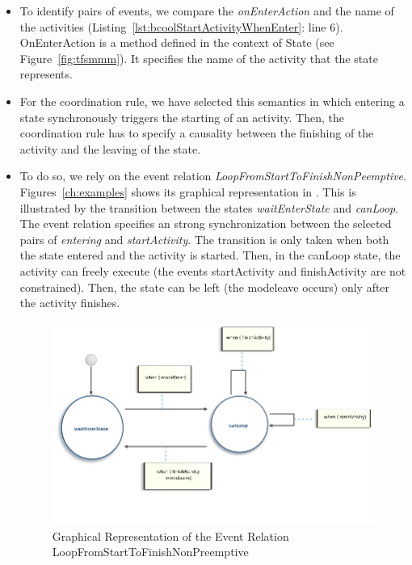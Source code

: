 \begin{itemize}
		 \item To identify pairs of events, we compare the \emph{onEnterAction} and the name of the activities (Listing~\ref{lst:bcoolStartActivityWhenEnter}: line 6). OnEnterAction is a method defined in the context of State (see Figure~\ref{fig:tfsmmm}). It specifies the name of the activity that the state represents. 
		  
		 
		 \item For the coordination rule, we have selected this semantics in which entering a state synchronously triggers the starting of an activity. Then, the coordination rule has to specify a causality between the finishing of the activity and the leaving of the state.     
		 
		 \item To do so, we rely on the event relation \emph{LoopFromStartToFinishNonPeemptive}. Figures~\ref{ch:examples} shows its graphical representation in \moccml. This is illustrated by the transition between the states \emph{waitEnterState} and \emph{canLoop}. The event relation specifies an strong synchronization between the selected pairs of \dse \emph{entering} and \emph{startActivity}. The transition is only taken when both the state entered and the activity is started. Then, in the canLoop state, the activity can freely execute (\ie the events startActivity and finishActivity are not constrained). Then, the state can be left (the modeleave occurs) only after the activity finishes.       
		 
		
		
			\begin{figure}
				\center
				\includegraphics[scale=0.5]{examples/figs/LoopFromStartToFinishNonPreemptive.png}
				\caption{Graphical Representation of the Event Relation LoopFromStartToFinishNonPreemptive}
				\label{fig:LoopFromStartToFinishNonPreemptive}
			\end{figure}
				

\end{itemize}
